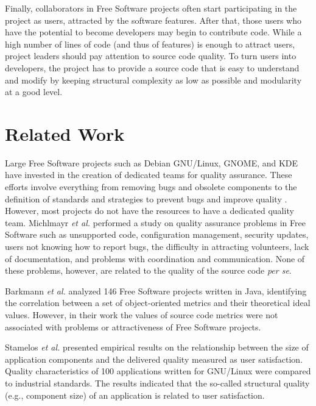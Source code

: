 \documentclass[conference]{IEEEtran}
\begin{document}
Finally, collaborators in Free Software projects often start participating in
the project as users, attracted by the software features.
%
After that, those users who have the potential to become developers may begin
to contribute code.
%
While a high number of lines of code (and thus of features) is enough to attract
users, project leaders should pay attention to source code quality.
%
To turn users into developers, the project has to provide a source code that is
easy to understand and modify by keeping structural complexity as low as possible
and modularity at a good level.

\section{Related Work}
\label{related}

Large Free Software projects such as Debian GNU/Linux, GNOME, and KDE have invested in the
creation of dedicated teams for quality assurance. These efforts involve everything
from removing bugs and obsolete components to the definition of standards
and strategies to prevent bugs and improve quality \cite{Michlmayr2005}.
However, most projects do not have the resources to have a dedicated quality
team.
%
Michlmayr \emph{et al.} \cite{Michlmayr2005} performed a study on quality
assurance problems in Free Software such as unsupported code, configuration management,
security updates, users not knowing how to report bugs, the difficulty in
attracting volunteers, lack of documentation, and problems with coordination
and communication. None of these problems, however, are related to the quality
of the source code \emph{per se}.

Barkmann \emph{et al.} \cite{Barkmann2009} analyzed 146 Free Software projects
written in Java, identifying the correlation between a set of object-oriented
metrics and their theoretical ideal values. 
%
However, in their work the values of source code metrics were not associated
with problems or attractiveness of Free Software projects.

Stamelos \emph{et al.} \cite{Stamelos2002} presented empirical results on the relationship
between the size of application components and the delivered quality
measured as user satisfaction.
%
Quality characteristics of 100 applications written for GNU/Linux were compared to
industrial standards. The results indicated that the so-called structural
quality (e.g., component size) of an application is related to user satisfaction.
\end{document}
